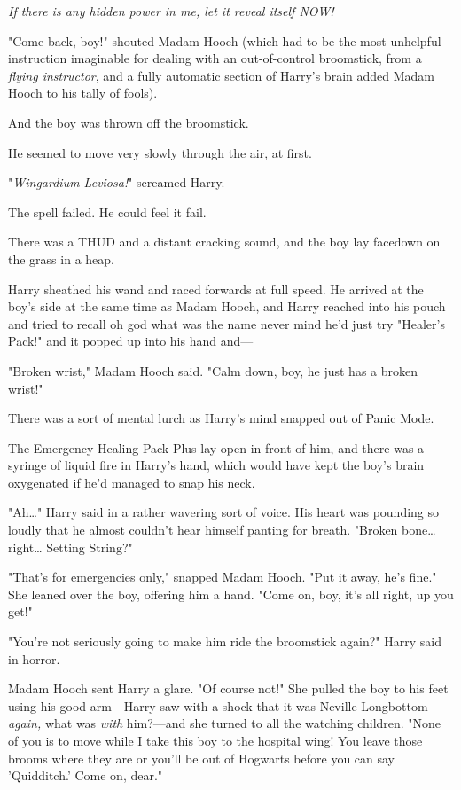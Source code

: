 \emph{If there is any hidden power in me, let it reveal itself NOW!}

"Come back, boy!" shouted Madam Hooch (which had to be the most unhelpful 
instruction imaginable for dealing with an out-of-control broomstick, from a 
\emph{flying instructor}, and a fully automatic section of Harry's brain added 
Madam Hooch to his tally of fools).

And the boy was thrown off the broomstick.

He seemed to move very slowly through the air, at first.

"\emph{Wingardium Leviosa!}" screamed Harry.

The spell failed. He could feel it fail.

There was a THUD and a distant cracking sound, and the boy lay facedown on the 
grass in a heap.

Harry sheathed his wand and raced forwards at full speed. He arrived at the 
boy's side at the same time as Madam Hooch, and Harry reached into his pouch 
and tried to recall oh god what was the name never mind he'd just try "Healer's 
Pack!" and it popped up into his hand and---

"Broken wrist," Madam Hooch said. "Calm down, boy, he just has a broken wrist!"

There was a sort of mental lurch as Harry's mind snapped out of Panic Mode.

The Emergency Healing Pack Plus lay open in front of him, and there was a 
syringe of liquid fire in Harry's hand, which would have kept the boy's brain 
oxygenated if he'd managed to snap his neck.

"Ah{\ldots}" Harry said in a rather wavering sort of voice. His heart was 
pounding so loudly that he almost couldn't hear himself panting for breath. 
"Broken bone{\ldots} right{\ldots} Setting String?"

"That's for emergencies only," snapped Madam Hooch. "Put it away, he's fine." 
She leaned over the boy, offering him a hand. "Come on, boy, it's all right, up 
you get!"

"You're not seriously going to make him ride the broomstick again?" Harry said 
in horror.

Madam Hooch sent Harry a glare. "Of course not!" She pulled the boy to his feet 
using his good arm---Harry saw with a shock that it was Neville Longbottom 
\emph{again,} what was \emph{with} him?---and she turned to all the watching 
children. "None of you is to move while I take this boy to the hospital wing! 
You leave those brooms where they are or you'll be out of Hogwarts before you 
can say 'Quidditch.' Come on, dear."

